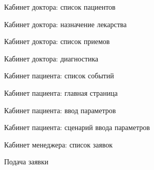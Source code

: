\newpage
\begin{figure}[h]
\caption{Кабинет доктора: список пациентов}
\label{app:doctor_cabinet_patients}
\end{figure}

\newpage \begin{figure}[h]
\caption{Кабинет доктора: назначение лекарства}
\label{app:doctor_cabinet_medicament}
\end{figure}

\newpage \begin{figure}[h]
\caption{Кабинет доктора: список приемов}
\label{app:doctor_cabinet_appointments}
\end{figure}

\newpage \begin{figure}[h]
\caption{Кабинет доктора: диагностика}
\label{app:doctor_cabinet_diagnostic}
\end{figure}

\newpage \begin{figure}[h]
\caption{Кабинет пациента: список событий}
\label{app:patient_cabinet_events}
\end{figure}

\newpage \begin{figure}[h]
\caption{Кабинет пациента: главная страница}
\label{app:patient_cabinet_main}
\end{figure}

\newpage \begin{figure}[h]
\caption{Кабинет пациента: ввод параметров}
\label{app:patient_cabinet_parameters}
\end{figure}

\newpage \begin{figure}[h]
\caption{Кабинет пациента: сценарий ввода параметров}
\label{app:enter_parameter}
\end{figure}

\newpage \begin{figure}[h]
\caption{Кабинет менеджера: список заявок}
\label{app:manager_cabinet_bid}
\end{figure}

\newpage \begin{figure}[h]
\caption{Подача заявки}
\label{app:bid_form}
\end{figure}

